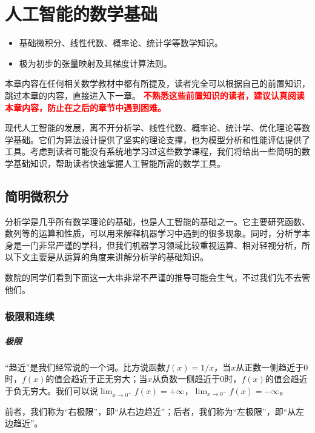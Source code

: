 \chapter{人工智能的数学基础}

\begin{intro}
    \begin{itemize}
        \item 基础微积分、线性代数、概率论、统计学等数学知识。
        \item 极为初步的张量映射及其梯度计算法则。
    \end{itemize}
    本章内容在任何相关数学教材中都有所提及，读者完全可以根据自己的前置知识，跳过本章的内容，直接进入下一章。
    \textcolor{red}{\bfseries 不熟悉这些前置知识的读者，建议认真阅读本章内容，防止在之后的章节中遇到困难。}
\end{intro}

现代人工智能的发展，离不开分析学、线性代数、概率论、统计学、优化理论等数学基础。它们为算法设计提供了坚实的理论支撑，也为模型分析和性能评估提供了工具。考虑到读者可能没有系统地学习过这些数学课程，我们将给出一些简明的数学基础知识，帮助读者快速掌握人工智能所需的数学工具。

\section{简明微积分}

分析学是几乎所有数学理论的基础，也是人工智能的基础之一。它主要研究函数、数列等的运算和性质，可以用来解释机器学习中遇到的很多现象。同时，分析学本身是一门非常严谨的学科，但我们机器学习领域比较重视运算、相对轻视分析，所以下文主要是从运算的角度来讲解分析学的基础知识。

数院的同学们看到下面这一大串非常不严谨的推导可能会生气，不过我们先不去管他们。

\subsection{极限和连续}

\paragraph{极限}

“趋近”是我们经常说的一个词。比方说函数$f(x) = 1/x$，当$x$从正数一侧趋近于0时，$f(x)$的值会趋近于正无穷大；当$x$从负数一侧趋近于0时，$f(x)$的值会趋近于负无穷大。我们可以说$\lim_{x \to 0^+} f(x) = +\infty$，$\lim_{x \to 0^-} f(x) = -\infty$。

前者，我们称为“右极限”，即“从右边趋近”；后者，我们称为“左极限”，即“从左边趋近”。

